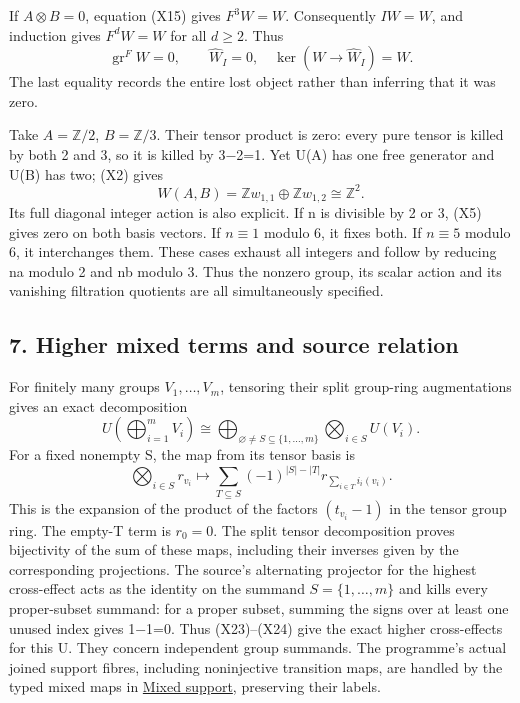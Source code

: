 \documentclass[
]{article}
\begin{document}
If \(A\otimes B=0\), equation (X15) gives \(F^3W=W\). Consequently
\(IW=W\), and induction gives \(F^dW=W\) for all \(d\ge2\). Thus \[
\operatorname{gr}^F W=0,\qquad\widehat W_I=0,
\quad\ker(W\to\widehat W_I)=W.
\tag{X21}
\] The last equality records the entire lost object rather than
inferring that it was zero.

Take \(A=\mathbb Z/2\), \(B=\mathbb Z/3\). Their tensor product is zero:
every pure tensor is killed by both 2 and 3, so it is killed by 3−2=1.
Yet U(A) has one free generator and U(B) has two; (X2) gives \[
W(A,B)=\mathbb Zw_{1,1}\oplus\mathbb Zw_{1,2}\cong\mathbb Z^2.
\tag{X22}
\] Its full diagonal integer action is also explicit. If n is divisible
by 2 or 3, (X5) gives zero on both basis vectors. If \(n\equiv1\) modulo
6, it fixes both. If \(n\equiv5\) modulo 6, it interchanges them. These
cases exhaust all integers and follow by reducing na modulo 2 and nb
modulo 3. Thus the nonzero group, its scalar action and its vanishing
filtration quotients are all simultaneously specified.

\subsection{7. Higher mixed terms and source
relation}\label{higher-mixed-terms-and-source-relation}

For finitely many groups \(V_1,\ldots,V_m\), tensoring their split
group-ring augmentations gives an exact decomposition \[
U\!\left(\bigoplus_{i=1}^mV_i\right)
\cong\bigoplus_{\varnothing\ne S\subseteq\{1,\ldots,m\}}
\bigotimes_{i\in S}U(V_i).
\tag{X23}
\] For a fixed nonempty S, the map from its tensor basis is \[
\bigotimes_{i\in S}r_{v_i}\longmapsto
\sum_{T\subseteq S}(-1)^{|S|-|T|}
r_{\sum_{i\in T}i_i(v_i)}.
\tag{X24}
\] This is the expansion of the product of the factors \((t_{v_i}-1)\)
in the tensor group ring. The empty-T term is \(r_0=0\). The split
tensor decomposition proves bijectivity of the sum of these maps,
including their inverses given by the corresponding projections. The
source's alternating projector for the highest cross-effect acts as the
identity on the summand \(S=\{1,\ldots,m\}\) and kills every
proper-subset summand: for a proper subset, summing the signs over at
least one unused index gives 1−1=0. Thus (X23)--(X24) give the exact
higher cross-effects for this U. They concern independent group
summands. The programme's actual joined support fibres, including
noninjective transition maps, are handled by the typed mixed maps in
\href{https://github.com/KokunoYumeto/zeta-function-research-reader/blob/6af54ea3c8ef99127af327f3103e086c68d482c2/workbenches/splitzero-tandem/branches/identity-absorber-square/MIXED_SUPPORT.md}{Mixed
support}, preserving their labels.
\end{document}

